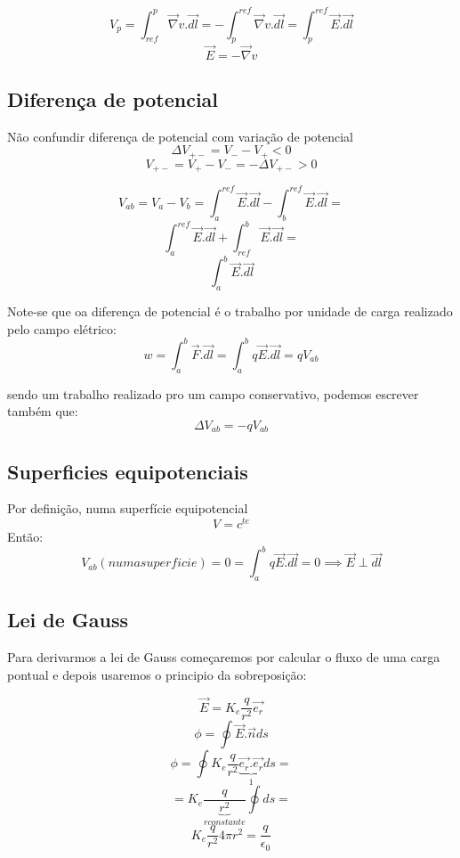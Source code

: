 \documentclass[a4paper]{article}
\begin{document}
\[V_p = \int_{ref}^{p}\vec{\nabla}v.\vec{dl}= -\int_{p}^{ref}\vec{\nabla}v.\vec{dl}= \int_{p}^{ref}\vec{E}.\vec{dl}\]
\[\vec{E} = -\vec{\nabla}v\]

\subsection{Diferença de potencial}
Não confundir diferença de potencial com variação de potencial
\[\Delta V_{+-} = V_- - V_+ < 0\]
\[V_{+-} = V_+ - V_-  = -\Delta V_{+-} > 0\]

\[V_{ab}=V_a - V_b = \int_{a}^{ref}\vec{E}.\vec{dl}-\int_{b}^{ref}\vec{E}.\vec{dl}=\]
\[\int_{a}^{ref}\vec{E}.\vec{dl}+\int_{ref}^{b}\vec{E}.\vec{dl}=\]
\[\int_{a}^{b}\vec{E}.\vec{dl}\]

Note-se que oa diferença de potencial é o trabalho por unidade de carga realizado pelo campo elétrico:
\[w= \int_{a}^{b}\vec{F}.\vec{dl}= \int_{a}^{b}q\vec{E}.\vec{dl}=qV_{ab}\]

sendo um trabalho realizado pro um campo conservativo, podemos escrever também que:
\[\Delta V_{ab}= -qV_{ab} \]

\subsection{Superficies equipotenciais}
Por definição, numa superfície equipotencial
\[V = c^{te}\]
Então:
\[V_{ab}(numa superficie) = 0 = \int_{a}^{b}q\vec{E}.\vec{dl} = 0 \implies \vec{E} \perp \vec{dl}\]


\subsection{Lei de Gauss}
Para derivarmos a lei de Gauss começaremos por calcular o fluxo de uma carga pontual e depois usaremos o principio da sobreposição:
\begin{center}
\end{center}
\[\vec{E} = K_e \frac{q}{r^2} \vec{e_r}\]
\[\phi = \oint\vec{E}.\vec{n}ds\]
\[\phi = \oint K_e \frac{q}{r^2}\underbrace{\vec{e_r}.\vec{e_r}}_1 ds =\]
\[=K_e \frac{q}{\underbrace{r^2}_{r constante}} \oint ds =\]
\[ K_e \frac{q}{r^2} 4\pi r^2 = \frac{q}{\epsilon_0}\]
\end{document}
